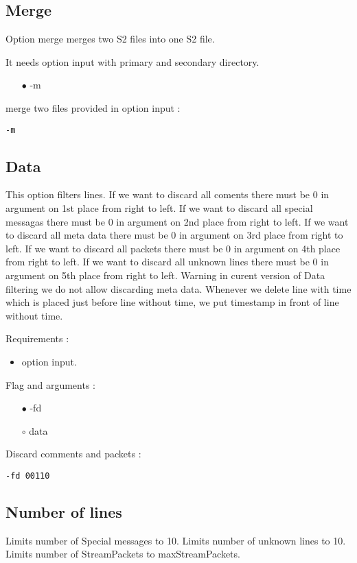 \documentclass[english]{article}
\begin{document}
\subsection{Merge}
Option merge merges two S2 files into one S2 file. 

It needs option input with primary and secondary directory.
\begin{itemize}
 \item[$\bullet$] -m
 \end{itemize}
merge two files provided in option input : \begin{lstlisting} 
-m
\end{lstlisting}


\subsection{Data}
This option filters lines. If we want to discard all coments there must be 0 in argument on 1st place from right to left. If we want to discard all special messagas there must be 0 in argument on 2nd place from right to left. If we want to discard all meta data there must be 0 in argument on 3rd place from right to left. If we want to discard all packets there must be 0 in argument on 4th place from right to left. If we want to discard all unknown lines there must be 0 in argument on 5th place from right to left. Warning in curent version of Data filtering we do not allow discarding meta data. Whenever we delete line with time which is placed just before line without time, we put timestamp in front of line without time.

\noindent Requirements : 
\begin{itemize}
\item option input. 
\end{itemize}
Flag and arguments :
\begin{itemize}
\item[$\bullet$] -fd
\item[$\circ$] data
\end{itemize}
Discard comments and packets : 
\begin{lstlisting} 
-fd 00110
\end{lstlisting}


\subsection{Number of lines}
Limits number of Special messages to 10. Limits number of unknown lines to 10. Limits number of StreamPackets to maxStreamPackets.
\end{document}
